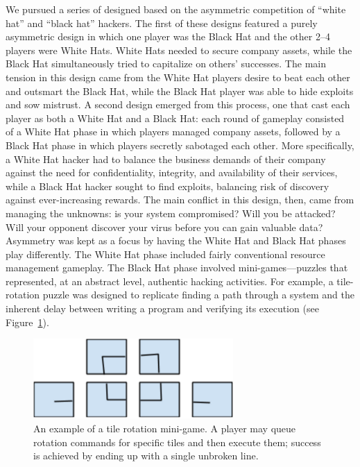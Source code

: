 \documentclass[letterpaper]{article}
\begin{document}
We pursued a series of designed based on the asymmetric competition of 
``white hat'' and ``black hat'' hackers.
The first of these designs featured a purely asymmetric design in which
one player was the Black Hat and the other 2--4 players were 
White Hats. White Hats needed to secure company assets, while the
Black Hat simultaneously tried to capitalize on others' successes.
The main tension 
in this design came from the White Hat players desire
to beat each other and outsmart the Black Hat, while the Black Hat
player was able to hide exploits and sow mistrust.
%
A second design emerged from this process, one that cast each player
as both a White Hat and a Black Hat: each round of gameplay consisted
of a White Hat phase in which players managed company assets, followed
by a Black Hat phase in which players secretly sabotaged each other.
More specifically, a White Hat hacker had to balance the business
demands of their company against the need for confidentiality,
integrity, and availability of their services, while a Black Hat
hacker sought to find exploits, balancing risk of discovery
against ever-increasing rewards.  The main
conflict in this design, then, came from managing the unknowns: is your
system compromised? Will you be attacked? Will your opponent discover
your virus before you can gain valuable data?
%
Asymmetry was kept as a focus by having the White Hat and Black Hat
phases play differently. The White Hat phase included fairly conventional
resource management gameplay.
The Black Hat phase involved mini-games---puzzles that represented,
at an abstract level, authentic hacking activities.
For example, a tile-rotation puzzle was designed to replicate
finding a path through a system and the inherent delay between
writing a program and verifying its execution (see Figure~\ref{fig:rotation}).
%
\begin{figure}\centering
\begin{framed}
\includegraphics[width=3in]{images/rotation.png}
\caption{An example of a tile rotation mini-game. A player
may queue rotation commands for specific tiles and then execute them;
success is achieved by ending up with a single unbroken line.}
\label{fig:rotation}
\end{framed}
\end{figure}
\end{document}
